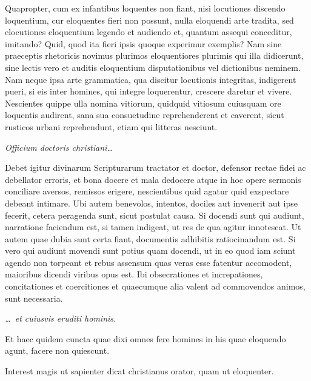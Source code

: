 Quapropter, cum ex infantibus loquentes non fiant, nisi locutiones discendo loquentium, cur eloquentes fieri non possunt, nulla eloquendi arte tradita, sed elocutiones eloquentium legendo et audiendo et, quantum assequi conceditur, imitando? Quid, quod ita fieri ipsis quoque experimur exemplis? Nam sine praeceptis rhetoricis novimus plurimos eloquentiores plurimis qui illa didicerunt, sine lectis vero et auditis eloquentium disputationibus vel dictionibus neminem. Nam neque ipsa arte grammatica, qua discitur locutionis integritas, indigerent pueri, si eis inter homines, qui integre loquerentur, crescere daretur et vivere. Nescientes quippe ulla nomina vitiorum, quidquid vitiosum cuiusquam ore loquentis audirent, sana sua consuetudine reprehenderent et caverent, sicut rusticos urbani reprehendunt, etiam qui litteras nesciunt.

\textit{Officium doctoris christiani\dots}

Debet igitur divinarum Scripturarum tractator et doctor, defensor rectae fidei ac debellator erroris, et bona docere et mala dedocere atque in hoc opere sermonis conciliare aversos, remissos erigere, nescientibus quid agatur quid exspectare debeant intimare. Ubi autem benevolos, intentos, dociles aut invenerit aut ipse fecerit, cetera peragenda sunt, sicut postulat causa. Si docendi sunt qui audiunt, narratione faciendum est, si tamen indigeat, ut res de qua agitur innotescat. Ut autem quae dubia sunt certa fiant, documentis adhibitis ratiocinandum est. Si vero qui audiunt movendi sunt potius quam docendi, ut in eo quod iam sciunt agendo non torpeant et rebus assensum quas veras esse fatentur accomodent, maioribus dicendi viribus opus est. Ibi obsecrationes et increpationes, concitationes et coercitiones et quaecumque alia valent ad commovendos animos, sunt necessaria.

\textit{\dots\ et cuiusvis eruditi hominis.}

Et haec quidem cuncta quae dixi omnes fere homines in his quae eloquendo agunt, facere non quiescunt.

Interest magis ut sapienter dicat christianus orator, quam ut eloquenter.

